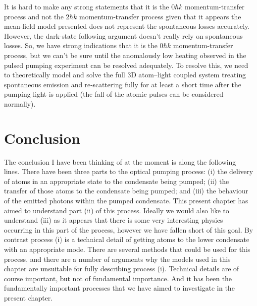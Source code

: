 It is hard to make any strong statements that it is the $0 \hbar k$ momentum-transfer process and not the $2 \hbar k$ momentum-transfer process given that it appears the mean-field model presented does not represent the spontaneous losses accurately.  However, the dark-state following argument doesn't really rely on spontaneous losses.  So, we have strong indications that it is the $0 \hbar k$ momentum-transfer process, but we can't be sure until the anomalously low heating observed in the pulsed pumping experiment can be resolved adequately.  To resolve this, we need to theoretically model and solve the full 3D atom--light coupled system treating spontaneous emission and re-scattering fully for at least a short time after the pumping light is applied (the fall of the atomic pulses can be considered normally).

\section{Conclusion}

The conclusion I have been thinking of at the moment is along the following lines.  There have been three parts to the optical pumping process: (i) the delivery of atoms in an appropriate state to the condensate being pumped; (ii) the transfer of those atoms to the condensate being pumped; and (iii) the behaviour of the emitted photons within the pumped condensate.  This present chapter has aimed to understand part (ii) of this process.  Ideally we would also like to understand (iii) as it appears that there is some very interesting physics occurring in this part of the process, however we have fallen short of this goal.  By contrast process (i) is a technical detail of getting atoms to the lower condensate with an appropriate mode.  There are several methods that could be used for this process, and there are a number of arguments why the models used in this chapter are unsuitable for fully describing process (i).  Technical details are of course important, but not of fundamental importance.  And it has been the fundamentally important processes that we have aimed to investigate in the present chapter.
